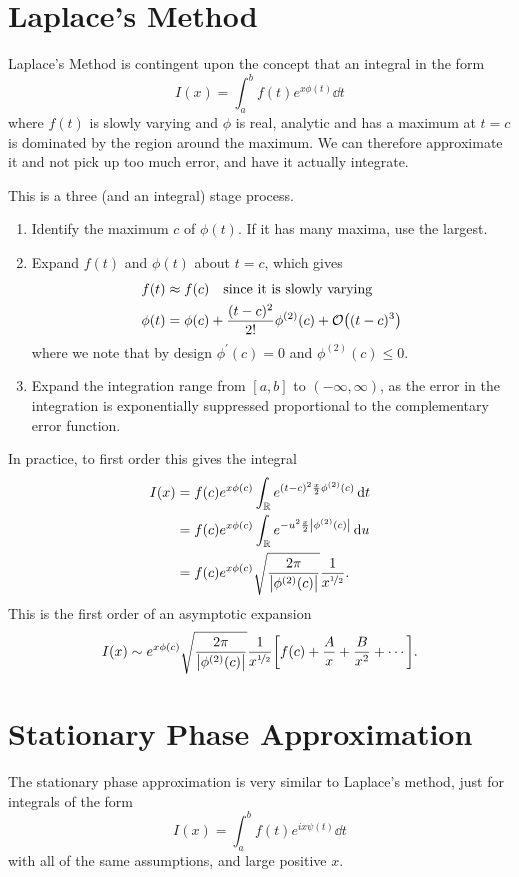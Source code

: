 \documentclass[a4paper,12pt,parskip=full,BCOR=1cm]{scrreprt}
\renewcommand{\leq}{\leqslant}
\begin{document}
\section{Laplace's Method}
Laplace's Method is contingent upon the concept that an integral in the form $$I(x) = \int_a^b f(t) e^{x\phi(t)}\dd{t}$$ where $f(t)$ is slowly varying and $\phi$ is real, analytic and has a maximum at $t=c$ is dominated by the region around the maximum.
We can therefore approximate it and not pick up too much error, and have it actually integrate.

This is a three (and an integral) stage process.
\begin{enumerate}
 \item Identify the maximum $c$ of $\phi(t)$.
If it has many maxima, use the largest.
 \item Expand $f(t)$ and $\phi(t)$ about $t=c$, which gives\begin{align*}
        f(t)    & \approx f(c) \quad \text{since it is slowly varying}                   \\
        \phi(t) & = \phi(c) + \frac{(t-c)^2}{2!}\phi^{(2)}(c) + \mathcal{O}\qty((t-c)^3)
       \end{align*}
       where we note that by design $\phi^{\prime}(c) = 0$ and $\phi^{(2)}(c)\leq 0$.
 \item Expand the integration range from $[a,b]$ to $(-\infty, \infty)$, as the error in the integration is exponentially suppressed proportional to the complementary error function.
\end{enumerate}

In practice, to first order this gives the integral
\begin{align*}
 I(x) & = f(c) e^{x\phi(c)}\int_\mathbb{R} e^{(t-c)^2 \frac{x}{2}\phi^{(2)}(c)}\dd{t}          \\
      & = f(c) e^{x\phi(c)}\int_\mathbb{R} e^{-u^2 \frac{x}{2}\abs{\phi^{(2)}(c)}}\dd{u}       \\
      & =f(c) e^{x\phi(c)} \sqrt\frac{2\pi}{\abs{\phi^{(2)}(c)}}\frac{1}{x^{\nicefrac{1}{2}}}.
\end{align*}
This is the first order of an asymptotic expansion
$$I(x) \sim e^{x\phi(c)} \sqrt\frac{2\pi}{\abs{\phi^{(2)}(c)}}\frac{1}{x^{\nicefrac{1}{2}}} \qty[f(c) + \frac{A}{x} + \frac{B}{x^2} + \cdots].$$
\section{Stationary Phase Approximation}
The stationary phase approximation is very similar to Laplace's method, just for integrals of the form $$I(x) = \int_a^b f(t) e^{ix\psi(t)}\dd{t}$$ with all of the same assumptions, and large positive $x$.
\end{document}
